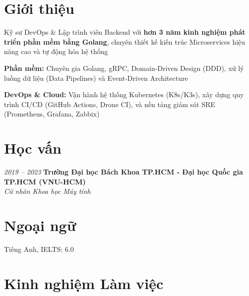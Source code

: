 \section{Giới thiệu}
\begin{onecolentry}
    \begin{highlights}
        \item Kỹ sư DevOps \& Lập trình viên Backend với \textbf{hơn 3 năm kinh nghiệm phát triển phần mềm bằng Golang}, chuyên thiết kế kiến trúc Microservices hiệu năng cao và tự động hóa hệ thống
        \item \textbf{Phần mềm:} Chuyên gia Golang, gRPC, Domain-Driven Design (DDD), xử lý luồng dữ liệu (Data Pipelines) và Event-Driven Architecture
        \item \textbf{DevOps \& Cloud:} Vận hành hệ thống Kubernetes (K8s/K3s), xây dựng quy trình CI/CD (GitHub Actions, Drone CI), và nền tảng giám sát SRE (Prometheus, Grafana, Zabbix)
    \end{highlights}
\end{onecolentry}

\section{Học vấn}
\begin{twocolentry}{\textit{2019 -- 2023}}
    \textbf{Trường Đại học Bách Khoa TP.HCM - Đại học Quốc gia TP.HCM (VNU-HCM)}\\[4pt]
    \textit{Cử nhân Khoa học Máy tính}
\end{twocolentry}

\section{Ngoại ngữ}
\begin{onecolentry}
    \begin{highlights}
        \item Tiếng Anh, IELTS: 6.0
    \end{highlights}
\end{onecolentry}

\section{Kinh nghiệm Làm việc}

